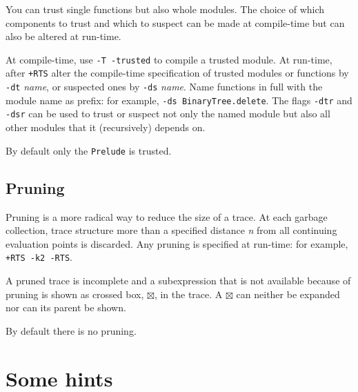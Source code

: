 \documentclass[12pt]{article}
\newcommand{\crossBox}{\boxtimes}
\begin{document}
You can trust single functions but also whole modules.
The choice of which components to trust and which to suspect can be made at
compile-time but can also be altered at run-time.
   
At compile-time, use \texttt{-T -trusted} to compile a trusted module. 
At run-time, after \texttt{+RTS} alter the compile-time specification
of trusted modules or functions by \texttt{-dt} \emph{name}, or suspected
ones by \texttt{-ds} \emph{name}.  Name functions in full with the
module name as prefix: for example, \texttt{-ds BinaryTree.delete}.
The flags \texttt{-dtr} and \texttt{-dsr} can be used to trust or suspect not only the
named module but also all other modules that it (recursively) depends on.
 
By default only the \texttt{Prelude} is trusted.


\subsection{Pruning}

Pruning is a more radical way to reduce the size of a trace.
At each garbage collection, trace structure more
than a specified distance \emph{n} from all continuing evaluation points
is discarded.  Any pruning is specified at run-time: for example,
\texttt{+RTS -k2 -RTS}.

A pruned trace is incomplete and a subexpression that is not available because of pruning is shown as crossed box, $\crossBox$, in the trace.
A $\crossBox$ can neither be expanded nor can its parent be shown.
   
By default there is no pruning.




\section{Some hints}
\end{document}
